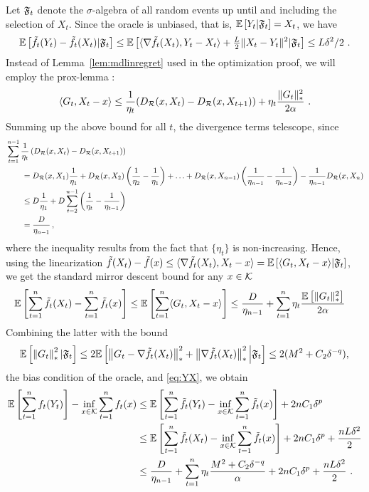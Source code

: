 Let $\mathfrak{F}_t$ denote the $\sigma$-algebra of all random events up until and including the selection of $X_t$. Since the oracle is unbiased, that is,  $\mathbb{E}\left[Y_t|\mathfrak{F}_t\right]=X_t$, we have
\begin{equation}
\mathbb{E}\left[\tilde{f}_t(Y_t)-\tilde{f}_t(X_t)|\mathfrak{F}_t\right] \le \mathbb{E}\left[\langle \nabla \tilde{f}_t(X_t),Y_t-X_t \rangle+\tfrac{L}{2}\|X_t-Y_t\|^2|\mathfrak{F}_t\right] \le L\delta^2/2~.
\label{eq:YX}
\end{equation}
Instead of Lemma~\ref{lem:mdlinregret} used in the optimization proof, we will employ the prox-lemma \citep[see, e.g.,][]{Beck2003mirror, NeJuLaSh09}:
\begin{equation}
\label{eq:proxlemma}
\langle G_t,X_t-x \rangle \le \frac{1}{\eta_t}(D_{\mathcal{R}}(x,X_t)-D_{\mathcal{R}}(x,X_{t+1})) + \eta_t \frac{\|G_t\|_*^2}{2\alpha}~.
\end{equation}
Summing up the above bound for all $t$, the divergence terms telescope, since
\begin{align}
\MoveEqLeft \sum_{t=1}^{n-1} \frac{1}{\eta_t} \left(\DR(x,X_t)-\DR(x,X_{t+1})\right)
 \nonumber \\
&= \DR(x,X_1) \frac{1}{\eta_1} + \DR(x,X_2) \left(\frac{1}{\eta_2}-\frac{1}{\eta_1}\right)
+ \ldots+\DR(x,X_{n-1}) \left(\frac{1}{\eta_{n-1}} -\frac{1}{\eta_{n-2}}\right)- \frac{1}{\eta_{n-1}} \DR(x,X_n) \nonumber \\
& \le D \frac{1}{\eta_1} + D \sum_{t=2}^{n-1} \left(\frac1{\eta_{t}}-\frac1{\eta_{t-1}}\right) \nonumber \\
& = \frac{D}{\eta_{n-1}}\,,  \label{eq:div-telescope}
\end{align}
where the inequality results from the fact that $\{\eta_t\}$ is non-increasing.
Hence, using the linearization $\tilde{f}(X_t) - \tilde{f}(x) \le \langle \nabla \tilde{f}_t(X_t),X_t-x \rangle = \mathbb{E}\left[\langle  G_t,X_t-x \rangle| \mathfrak{F}_t\right]$, 
we get the standard mirror descent bound for any $x \in \mathcal{K}$
\begin{align}
\mathbb{E}\left[\sum_{t=1}^n \tilde{f}_t(X_t)- \sum_{t=1}^n \tilde{f}_t(x)\right] 
& \le \mathbb{E}\left[\sum_{t=1}^n \langle G_t,X_t-x \rangle\right] 
\le \frac{D}{\eta_{n-1}} + \sum_{t=1}^n \eta_t \frac{\mathbb{E}\left[\|G_t\|_*^2\right]}{2\alpha} 
\label{eq:md-bound}
\end{align}
Combining the latter with the bound
\[
\mathbb{E}\left[\left\|G_t\right\|_*^2 | \mathfrak{F}_t\right] \le 2\mathbb{E}\left[\left\|G_t - \nabla \tilde{f}_t(X_t)\right\|_*^2 + \left\|\nabla \tilde{f}_t(X_t)\right\|_*^2 \Big| \mathfrak{F}_t\right]
\le 2(M^2 + C_2 \delta^{-q}),
\]
the bias condition of the oracle, and \eqref{eq:YX}, we obtain
\begin{align*}
\mathbb{E}\left[\sum_{t=1}^n f_t(Y_t)\right] - \inf_{x \in \mathcal{K}} \sum_{t=1}^n f_t(x)
& \le \mathbb{E}\left[\sum_{t=1}^n \tilde{f}_t(Y_t) - \inf_{x \in \mathcal{K}} \sum_{t=1}^n \tilde{f}_t(x)\right] + 2 n C_1 \delta^{p} \\
& \le \mathbb{E}\left[\sum_{t=1}^n \tilde{f}_t(X_t) - \inf_{x \in \mathcal{K}} \sum_{t=1}^n \tilde{f}_t(x)\right] + 2 n C_1 \delta^{p} + \frac{n L \delta^2}{2} \\
& \le \frac{D}{\eta_{n-1}}  + \sum_{t=1}^n \eta_t \frac{M^2 + C_2 \delta^{-q}}{\alpha} +  2 n C_1 \delta^{p} + \frac{n L \delta^2}{2}~.
\end{align*}
